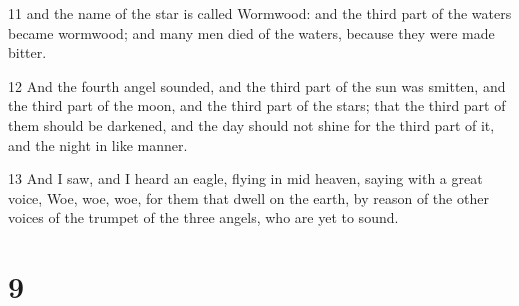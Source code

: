 \par 11 and the name of the star is called Wormwood: and the third part of the waters became wormwood; and many men died of the waters, because they were made bitter.
\par 12 And the fourth angel sounded, and the third part of the sun was smitten, and the third part of the moon, and the third part of the stars; that the third part of them should be darkened, and the day should not shine for the third part of it, and the night in like manner.
\par 13 And I saw, and I heard an eagle, flying in mid heaven, saying with a great voice, Woe, woe, woe, for them that dwell on the earth, by reason of the other voices of the trumpet of the three angels, who are yet to sound.

\chapter{9}

